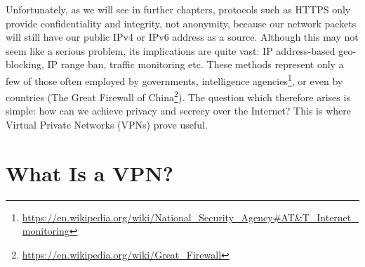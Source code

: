 \documentclass[a4paper,12pt]{report}
\begin{document}
		Unfortunately, as we will see in further chapters, protocols such as HTTPS only provide confidentiality and integrity, not anonymity, because our network packets will still have our public IPv4 or IPv6 address as a source. Although this may not seem like a serious problem, its implications are quite vast: IP address-based geo-blocking, IP range ban, traffic monitoring etc. These methods represent only a few of those often employed by governments, intelligence agencies\footnote{\url{https://en.wikipedia.org/wiki/National_Security_Agency\#AT&T_Internet_monitoring}}, or even by countries (The Great Firewall of China\footnote{\url{https://en.wikipedia.org/wiki/Great_Firewall}}). The question which therefore arises is simple: how can we achieve privacy and secrecy over the Internet? This is where Virtual Private Networks (VPNs) prove useful.
		
		\section{What Is a VPN?}
\end{document}
